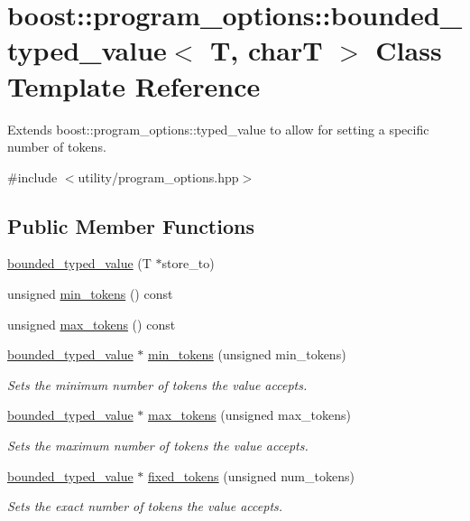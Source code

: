 \hypertarget{classboost_1_1program__options_1_1bounded__typed__value}{}\section{boost\+:\+:program\+\_\+options\+:\+:bounded\+\_\+typed\+\_\+value$<$ T, charT $>$ Class Template Reference}
\label{classboost_1_1program__options_1_1bounded__typed__value}


Extends boost\+::program\+\_\+options\+::typed\+\_\+value to allow for setting a specific number of tokens.  




{\ttfamily \#include $<$utility/program\+\_\+options.\+hpp$>$}

\subsection*{Public Member Functions}
\begin{DoxyCompactItemize}
\item 
\hyperlink{classboost_1_1program__options_1_1bounded__typed__value_a12afa63e7f1d130c2e4be4c33f311263}{bounded\+\_\+typed\+\_\+value} (T $\ast$store\+\_\+to)
\item 
unsigned \hyperlink{classboost_1_1program__options_1_1bounded__typed__value_a67e6498d4ded608e3524ad10b2da0172}{min\+\_\+tokens} () const 
\item 
unsigned \hyperlink{classboost_1_1program__options_1_1bounded__typed__value_af086d6e78b7e7f849bd1f4842a13bb93}{max\+\_\+tokens} () const 
\item 
\hyperlink{classboost_1_1program__options_1_1bounded__typed__value}{bounded\+\_\+typed\+\_\+value} $\ast$ \hyperlink{group___utility_module_ga92bfc58add0451fb2f594e7b78ff966c}{min\+\_\+tokens} (unsigned min\+\_\+tokens)
\begin{DoxyCompactList}\small\item\em Sets the minimum number of tokens the value accepts. \end{DoxyCompactList}\item 
\hyperlink{classboost_1_1program__options_1_1bounded__typed__value}{bounded\+\_\+typed\+\_\+value} $\ast$ \hyperlink{group___utility_module_ga88b81b9c4d7c1f667594d6e1490078ff}{max\+\_\+tokens} (unsigned max\+\_\+tokens)
\begin{DoxyCompactList}\small\item\em Sets the maximum number of tokens the value accepts. \end{DoxyCompactList}\item 
\hyperlink{classboost_1_1program__options_1_1bounded__typed__value}{bounded\+\_\+typed\+\_\+value} $\ast$ \hyperlink{group___utility_module_ga1a9caf446ce6f236f70dfd6a54885478}{fixed\+\_\+tokens} (unsigned num\+\_\+tokens)
\begin{DoxyCompactList}\small\item\em Sets the exact number of tokens the value accepts. \end{DoxyCompactList}\end{DoxyCompactItemize}



